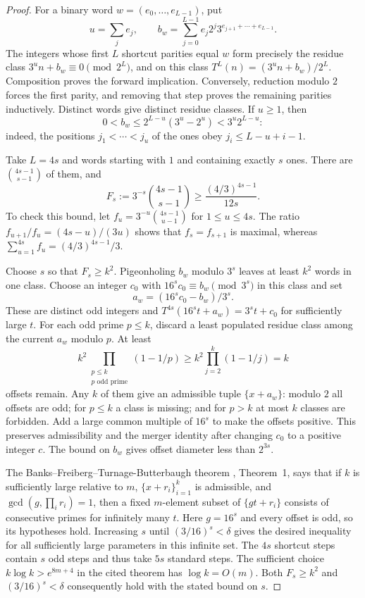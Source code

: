 \documentclass[11pt,a4paper]{article}
\theoremstyle{definition}
\theoremstyle{remark}
\numberwithin{equation}{section}
\begin{document}
\begin{proof}
For a binary word $w=(e_0,\ldots,e_{L-1})$, put
\[
 u=\sum_j e_j,\qquad
 b_w=\sum_{j=0}^{L-1}e_j2^j3^{e_{j+1}+\cdots+e_{L-1}}.
\]
The integers whose first $L$ shortcut parities equal $w$ form precisely the
residue class $3^u n+b_w\equiv0\pmod{2^L}$, and on this class
$T^L(n)=(3^u n+b_w)/2^L$. Composition proves the forward implication.
Conversely, reduction modulo $2$ forces the first parity, and removing
that step proves the remaining parities inductively. Distinct words give
distinct residue classes. If $u\ge1$, then
\[
 0<b_w\le2^{L-u}(3^u-2^u)<3^u2^{L-u}:
\]
indeed, the positions $j_1<\cdots<j_u$ of the ones obey
$j_i\le L-u+i-1$.

Take $L=4s$ and words starting with $1$ and containing exactly $s$ ones.
There are $\binom{4s-1}{s-1}$ of them, and
\[
 F_s:=3^{-s}\binom{4s-1}{s-1}
 \ge\frac{(4/3)^{4s-1}}{12s}.
\]
To check this bound, let $f_u=3^{-u}\binom{4s-1}{u-1}$ for
$1\le u\le4s$. The ratio $f_{u+1}/f_u=(4s-u)/(3u)$ shows that
$f_s=f_{s+1}$ is maximal, whereas
$\sum_{u=1}^{4s}f_u=(4/3)^{4s-1}/3$.

Choose $s$ so that $F_s\ge k^2$. Pigeonholing $b_w$ modulo $3^s$
leaves at least $k^2$ words in one class. Choose an integer $c_0$ with
$16^sc_0\equiv b_w\pmod{3^s}$ in this class and set
\[
 a_w=(16^sc_0-b_w)/3^s.
\]
These are distinct odd integers and
$T^{4s}(16^st+a_w)=3^st+c_0$ for sufficiently large $t$.
For each odd prime $p\le k$, discard a least populated residue class
among the current $a_w$ modulo $p$. At least
\[
 k^2\prod_{\substack{p\le k\\p\text{ odd prime}}}(1-1/p)
 \ge k^2\prod_{j=2}^k(1-1/j)=k
\]
offsets remain. Any $k$ of them give an admissible tuple
$\{x+a_w\}$: modulo $2$ all offsets are odd; for $p\le k$ a class is
missing; and for $p>k$ at most $k$ classes are forbidden. Add a large common
multiple of $16^s$ to make the offsets positive. This preserves
admissibility and the merger identity after changing $c_0$ to a positive
integer $c$. The bound on $b_w$ gives offset diameter less than $2^{3s}$.

The Banks--Freiberg--Turnage-Butterbaugh theorem \cite{R007},
Theorem~1, says that if $k$ is sufficiently large relative to $m$,
$\{x+r_i\}_{i=1}^k$ is admissible, and
$\gcd(g,\prod_i r_i)=1$, then a fixed $m$-element subset of
$\{gt+r_i\}$ consists of consecutive primes for infinitely many $t$.
Here $g=16^s$ and every offset is odd, so its hypotheses hold.
Increasing $s$ until $(3/16)^s<\delta$ gives the desired inequality for
all sufficiently large parameters in this infinite set. The $4s$
shortcut steps contain $s$ odd steps and thus take $5s$ standard steps.
The sufficient choice $k\log k>e^{8m+4}$ in the cited theorem has
$\log k=O(m)$. Both $F_s\ge k^2$ and $(3/16)^s<\delta$ consequently
hold with the stated bound on $s$.
\end{proof}
\end{document}
